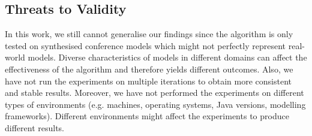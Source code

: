 \documentclass{llncs}
\begin{document}

\subsection{Threats to Validity}
In this work, we still cannot generalise our findings since the algorithm is only tested on synthesised conference models which might not perfectly represent real-world models. Diverse characteristics of models in different domains can affect the effectiveness of the algorithm and therefore yields different outcomes. Also, we have not run the experiments on multiple iterations to obtain more consistent and stable results. Moreover, we have not performed the experiments on different types of environments (e.g. machines, operating systems, Java versions, modelling frameworks). Different environments might affect the experiments to produce different results. 




\end{document}
